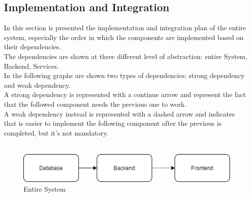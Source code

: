 





\subsection{Implementation and Integration}
In this section is presented the implementation and integration plan of the entire system, especially the order in which the components are implemented based on their dependencies.\\
The dependencies are shown at three different level of abstraction: entire System, Backend, Services. \\
In the following graphs are shown two types of dependencies: strong dependency and weak dependency.\\
A strong dependency is represented with a continue arrow and represent the fact that the followed component needs the previous one to work.\\
A weak dependency instead is represented with a dashed arrow and indicates that is easier to implement the following component after the previous is completed, but it's not mandatory.\\
\\
\begin{figure}[H]
    \centering
    \includegraphics{Images/IntegrationAndTestingPlan/System.png}
    \caption{Entire System}
    \label{fig:System}
\end{figure}

